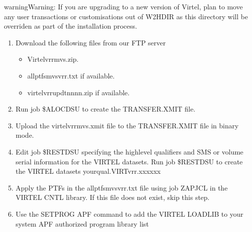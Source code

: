 \documentclass[letterpaper,10pt,english]{sphinxmanual}
\begin{document}
\begin{sphinxadmonition}{warning}{Warning:}
\sphinxAtStartPar
If you are upgrading to a new version of Virtel, plan to move any user transactions or customisations out of W2H\sphinxhyphen{}DIR as this directory will be overriden as part of the installation process.
\end{sphinxadmonition}
\begin{enumerate}
%
\item {} 
\sphinxAtStartPar
Download the following files from our FTP server 
\begin{itemize}
\item {} 
\sphinxAtStartPar
Virtelvrrmvs.zip.

\item {} 
\sphinxAtStartPar
allptfs\sphinxhyphen{}mvsvrr.txt if available.

\item {} 
\sphinxAtStartPar
virtelvrrupdtnnnn.zip if available.

\end{itemize}

\item {} 
\sphinxAtStartPar
Run job \$ALOCDSU to create the TRANSFER.XMIT file.

\item {} 
\sphinxAtStartPar
Upload the virtelvrrmvs.xmit file to the TRANSFER.XMIT file in binary mode.

\item {} 
\sphinxAtStartPar
Edit job \$RESTDSU specifying the high\sphinxhyphen{}level qualifiers and SMS or volume serial information for the VIRTEL datasets. Run job \$RESTDSU to create the VIRTEL datasets yourqual.VIRTvrr.xxxxxx

\item {} 
\sphinxAtStartPar
Apply the PTFs in the allptfs\sphinxhyphen{}mvsvrr.txt file using job ZAPJCL in the VIRTEL CNTL library. If this file does not exist, skip this step.

\item {} 
\sphinxAtStartPar
Use the SETPROG APF command to add the VIRTEL LOADLIB to your system APF authorized program library list

\end{enumerate}
\end{document}
